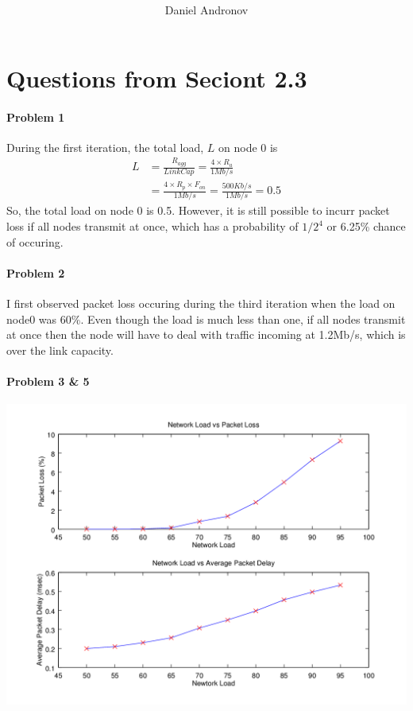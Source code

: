 \documentclass[12pt]{article}
\title{\type{} \hwNum{}}
\author{Daniel Andronov}
\date{\displaydate{date}}
\begin{document}
\maketitle
\newpage

\section{Questions from Seciont 2.3}


\paragraph{Problem 1}
During the first iteration, the total load, $L$ on node 0 is \\
\begin{align}
 L & = \frac{ R_{agg} }{Link Cap }  = \frac{  4 \times R_a }{1 Mb/s }\\
&   = \frac{ 4\times R_p \times F_{on} }{1 Mb/s } = \frac{500 Kb/s}{1Mb/s} = 0.5 
\end{align}
So, the total load on node 0 is 0.5. However, it is still possible to incurr packet loss if all nodes transmit at once, which has a probability of $1/2^4$ or 6.25\% chance of occuring. 

\paragraph{Problem 2}
I first observed packet loss occuring during the third iteration when the load on node0 was 60\%. Even though the load is much less than one, if all nodes transmit at once then the node will have to deal with traffic incoming at 1.2Mb/s, which is over the link capacity. 

\paragraph{Problem 3 \& 5}
\includegraphics{fig}
\end{document}
